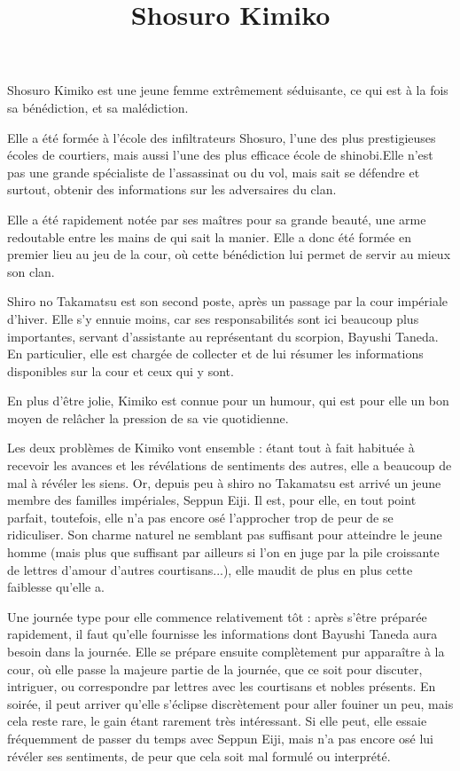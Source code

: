\documentclass[10pt,a4paper]{article}
\title{Shosuro Kimiko}
\author{}
\date{}
\begin{document}
\maketitle
Shosuro Kimiko est une jeune femme extrêmement séduisante, ce qui est à la fois sa bénédiction, et sa malédiction.

Elle a été formée à l'école des infiltrateurs Shosuro, l'une des plus prestigieuses écoles de courtiers, mais aussi l'une des plus efficace école de shinobi.Elle n'est pas une grande spécialiste de l'assassinat ou du vol, mais sait se défendre et surtout, obtenir des informations sur les adversaires du clan.

Elle a été rapidement notée par ses maîtres pour sa grande beauté, une arme redoutable entre les mains de qui sait la manier. Elle a donc été formée en premier lieu au jeu de la cour, où cette bénédiction lui permet de servir au mieux son clan.

Shiro no Takamatsu est son second poste, après un passage par la cour impériale d'hiver. Elle s'y ennuie moins, car ses responsabilités sont ici beaucoup plus importantes, servant d'assistante au représentant du scorpion, Bayushi Taneda. En particulier, elle est chargée de collecter et de lui résumer les informations disponibles sur la cour et ceux qui y sont.

En plus d'être jolie, Kimiko est connue pour un humour, qui est pour elle un bon moyen de relâcher la pression de sa vie quotidienne. 

Les deux problèmes de Kimiko vont ensemble : étant tout à fait habituée à recevoir les avances et les révélations de sentiments des autres, elle a beaucoup de mal à révéler les siens. Or, depuis peu à shiro no Takamatsu est arrivé un jeune membre des familles impériales, Seppun Eiji. Il est, pour elle, en tout point parfait, toutefois, elle n'a pas encore osé l'approcher trop de peur de se ridiculiser. Son charme naturel ne semblant pas suffisant pour atteindre le jeune homme (mais plus que suffisant par ailleurs si l'on en juge par la pile croissante de lettres d'amour d'autres courtisans...), elle maudit de plus en plus cette faiblesse qu'elle a.

Une journée type pour elle commence relativement tôt : après s'être préparée rapidement, il faut qu'elle fournisse les informations dont Bayushi Taneda aura besoin dans la journée. Elle se prépare ensuite complètement pur apparaître à la cour, où elle passe la majeure partie de la journée, que ce soit pour discuter, intriguer, ou correspondre par lettres avec les courtisans et nobles présents. En soirée, il peut arriver qu'elle s'éclipse discrètement pour aller fouiner un peu, mais cela reste rare, le gain étant rarement très intéressant. Si elle peut, elle essaie fréquemment de passer du temps avec Seppun Eiji, mais n'a pas encore osé lui révéler ses sentiments, de peur que cela soit mal formulé ou interprété.
\end{document}
